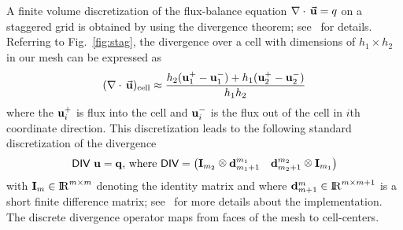 \documentclass[english]{siamltex}
\newcommand {\R}    {{\rm I\!R}}
\newcommand {\bfu}   { {\bf u} }
\newcommand {\bfq}   { {\bf q} }
\newcommand {\vu}  { {\vec {\bf  u}} }   %
\renewcommand{\div}{\nabla\cdot\,}
\newcommand{\DIVh}   {{\textsf{DIV}}}  %
\def\kronecker{\raisebox{1pt}{\ensuremath{\:\otimes\:}}}
\begin{document}
A finite volume discretization of the flux-balance equation $\div \vu = q$ on a staggered grid
is obtained by using the divergence theorem; see~\cite{ha} for details. 
Referring to Fig.~\ref{fig:stag}, the divergence over a cell with dimensions
of $h_{1} \times h_{2}$ in our mesh can be expressed as
$$ (\div \vu)_{\rm cell} \approx {\frac { h_{2}(\bfu_{1}^{+} - \bfu_{1}^{-}) +  h_{1}(\bfu_{2}^{+} - \bfu_{2}^{-})}{h_{1}h_{2}}} $$
where the $\bfu_{i}^{+}$ is flux into the cell and $\bfu_{i}^{-}$ is the flux out of the cell in $i$th coordinate direction.
This discretization leads to the following standard discretization of the divergence
\begin{equation}
\label{diveq}
 \DIVh\ \bfu = \bfq \text{, where }
	\DIVh = \begin{pmatrix}
					{\bf I}_{m_{2}} \kronecker {\bf d}_{m_{1}+1}^{m_{1}} &   {\bf d}_{m_{2}+1}^{m_{2}} \kronecker
					 {\bf I}_{m_{1}}
				\end{pmatrix}
\end{equation} 
with ${\bf I}_m \in \R^{m \times m}$ denoting the identity 
matrix and where ${\bf d}_{m+1}^m \in \R^{m \times m+1}$ is a short finite difference matrix; see~\cite{ModSiamBook} for more details about the implementation.
The discrete divergence operator maps from faces of the mesh to cell-centers.
\end{document}

